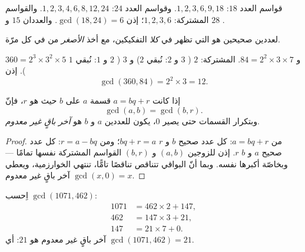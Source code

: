 \begin{example}
قواسم العدد $18$: $1, 2, 3, 6, 9, 18$. وقواسم العدد $24$:
$1, 2, 3, 4, 6, 8, 12, 24$. والقواسم المشتركة: $1, 2, 3, 6$؛ إذن
$\gcd(18, 24) = 6$. والعددان $15$ و $28$ .
\end{example}

\begin{proposition}\label{prop:g9:arith:gcdfact}
 لعددين صحيحين هو  
التي تظهر في \emph{كلا} التفكيكين، مع أخذ \emph{الأصغر} من
 في كل مرّة.
\end{proposition}
\admitted

\begin{example}\label{ex:g9:arith:gcdfact}
$360 = 2^3 \times 3^2 \times 5$ و $84 = 2^2 \times 3 \times 7$.
 المشتركة: $2$ ( $3$ و $2$: نُبقي $2$)
و $3$ ( $2$ و $1$: نُبقي $1$). إذن
\[
\gcd(360, 84) = 2^2 \times 3 = 12 .
\]
\end{example}

\begin{theorem}\label{thm:g9:arith:euclidalgo}
إذا كانت $a = bq + r$ قسمة $a$ على $b$ حيث  هو $r$، فإنّ
\[
\gcd(a, b) = \gcd(b, r).
\]
وبتكرار القسمات حتى يصير  $0$، يكون 
للعددين $a$ و $b$ هو \emph{آخر باقٍ غير معدوم}.
\end{theorem}

\begin{proof}
من $a = bq + r$: كل عدد صحيح  $b$ و $r$  $bq + r = a$؛
ومن $r = a - bq$: كل عدد صحيح  $a$ و $b$  $r$. إذن للزوجين
$(a, b)$ و $(b, r)$ القواسم المشتركة نفسها تمامًا --- وبخاصّة
أكبرها نفسه. وبما أنّ البواقي تتناقص تناقصًا تامًّا، تنتهي
الخوارزمية، ويعطي $\gcd(x, 0) = x$ آخر باقٍ غير معدوم.
\end{proof}

\begin{example}\label{ex:g9:arith:euclidalgo}
اِحسب $\gcd(1071, 462)$:
\begin{align*}
1071 &= 462 \times 2 + 147, \\
462 &= 147 \times 3 + 21, \\
147 &= 21 \times 7 + 0 .
\end{align*}
آخر باقٍ غير معدوم هو $21$: أي $\gcd(1071, 462) = 21$.
\end{example}

